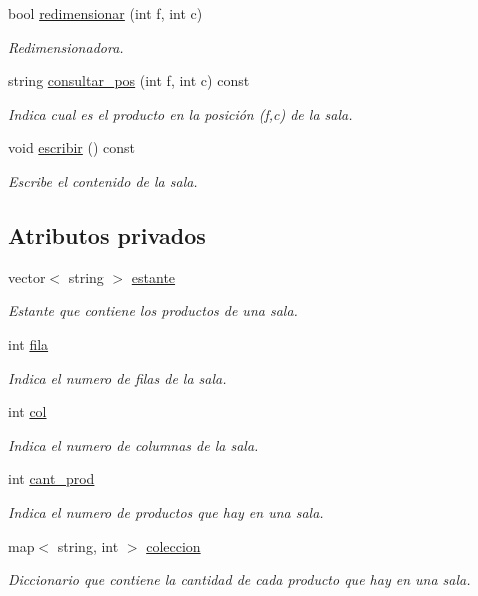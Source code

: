 \begin{DoxyCompactItemize}
bool \hyperlink{class_sala_a0cc52e1cce4b5b6817d5023b4b501d74}{redimensionar} (int f, int c)
\begin{DoxyCompactList}\small\item\em Redimensionadora. \end{DoxyCompactList}\item 
string \hyperlink{class_sala_a10ebb5fa73d3a8d5202960b3e7dc0605}{consultar\+\_\+pos} (int f, int c) const 
\begin{DoxyCompactList}\small\item\em Indica cual es el producto en la posición (f,c) de la sala. \end{DoxyCompactList}\item 
void \hyperlink{class_sala_a31cac453fd5002b715706482b207ac1f}{escribir} () const 
\begin{DoxyCompactList}\small\item\em Escribe el contenido de la sala. \end{DoxyCompactList}\end{DoxyCompactItemize}
\subsection*{Atributos privados}
\begin{DoxyCompactItemize}
\item 
vector$<$ string $>$ \hyperlink{class_sala_ad5a8ee89a13199441da41fee39a80444}{estante}
\begin{DoxyCompactList}\small\item\em Estante que contiene los productos de una sala. \end{DoxyCompactList}\item 
int \hyperlink{class_sala_a090b8f87fae0a129fb45ef59163a2820}{fila}
\begin{DoxyCompactList}\small\item\em Indica el numero de filas de la sala. \end{DoxyCompactList}\item 
int \hyperlink{class_sala_a72a33e3787879e17844a904e19c6a4b4}{col}
\begin{DoxyCompactList}\small\item\em Indica el numero de columnas de la sala. \end{DoxyCompactList}\item 
int \hyperlink{class_sala_aeb69af6cc00cfc97cfa4d18e1bd5e232}{cant\+\_\+prod}
\begin{DoxyCompactList}\small\item\em Indica el numero de productos que hay en una sala. \end{DoxyCompactList}\item 
map$<$ string, int $>$ \hyperlink{class_sala_a1eea693397545de9c4750859bb58eae8}{coleccion}
\begin{DoxyCompactList}\small\item\em Diccionario que contiene la cantidad de cada producto que hay en una sala. \end{DoxyCompactList}\end{DoxyCompactItemize}


